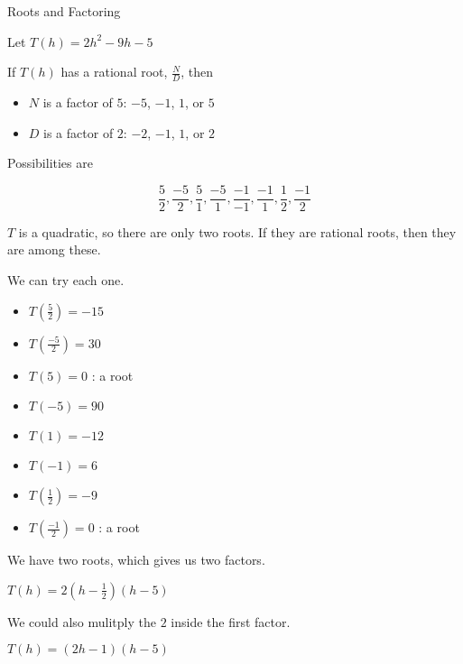 \documentclass{ximera}
\begin{document}
\begin{example}  Roots and Factoring


Let $T(h) = 2 h^2 - 9h - 5$



If $T(h)$ has a rational root, $\frac{N}{D}$, then


\begin{itemize}
\item $N$ is a factor of $5$: $-5$, $-1$, $1$, or $5$
\item $D$ is a factor of $2$: $-2$, $-1$, $1$, or $2$
\end{itemize}



Possibilities are 

\[  \frac{5}{2}, \frac{-5}{2}, \frac{5}{1}, \frac{-5}{1}, \frac{-1}{-1}, \frac{-1}{1}, \frac{1}{2}, \frac{-1}{2}   \]


$T$ is a quadratic, so there are only two roots. If they are rational roots, then they are among these.


We can try each one.



\begin{itemize}
\item $T\left( \frac{5}{2} \right) = -15$
\item $T\left( \frac{-5}{2} \right) = 30$
\item $T(5) = 0$   : a root
\item $T(-5) = 90$
\item $T(1) = -12$   
\item $T(-1) = 6$
\item $T\left( \frac{1}{2} \right) = -9$
\item $T\left( \frac{-1}{2} \right) = 0$ : a root
\end{itemize}

We have two roots, which gives us two factors.


$T(h) = 2\left(h-\frac{1}{2} \right)(h-5)$

We could also mulitply the $2$ inside the first factor.


$T(h) = (2h - 1)(h-5)$



\end{example}
\end{document}
